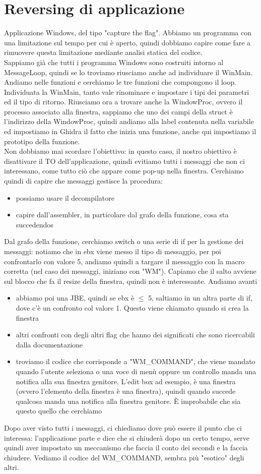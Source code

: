 \documentclass[12pt, oneside]{extbook}
\begin{document}
\section{Reversing di applicazione}
Applicazione Windows, del tipo "capture the flag". Abbiamo un programma con una limitazione sul tempo per cui è aperto, quindi dobbiamo capire come fare a rimuovere questa limitazione mediante analisi statica del codice.\\ Sappiamo già che tutti i programma Windows sono costruiti intorno al MessageLoop, quindi se lo troviamo riusciamo anche ad individuare il WinMain. Andiamo nelle funzioni e cerchiamo le tre funzioni che compongono il loop. Individuata la WinMain, tanto vale rinominare e impostare i tipi dei parametri ed il tipo di ritorno. Riusciamo ora a trovare anche la WindowProc, ovvero il processo associato alla finestra, sappiamo che uno dei campi della struct è l'indirizzo della WindowProc, quindi andiamo alla label contenuta nella variabile ed impostiamo in Ghidra il fatto che inizia una funzione, anche qui impostiamo il prototipo della funzione.\\ Non dobbiamo mai scordare l'obiettivo: in questo caso, il nostro obiettivo è disattivare il TO dell'applicazione, quindi evitiamo tutti i messaggi che non ci interessano, come tutto ciò che appare come pop-up nella finestra. Cerchiamo quindi di capire che messaggi gestisce la procedura:
\begin{itemize}
\item possiamo usare il decompilatore
\item capire dall'assembler, in particolare dal grafo della funzione, cosa sta succedendos
\end{itemize}
Dal grafo della funzione, cerchiamo switch o una serie di if per la gestione dei messaggi: notiamo che in ebx viene messo il tipo di messaggio, per poi confrontarlo con valore 5, andiamo quindi a targare il messaggio con la macro corretta (nel caso dei messaggi, iniziano con "WM"). Capiamo che il salto avviene sul blocco che fa il resize della finestra, quindi non è interessante. Andiamo avanti 
\begin{itemize}
\item abbiamo poi una JBE, quindi se ebx è $\leq$ 5, saltiamo in un altra parte di if, dove c'è un confronto col valore 1. Questo viene chiamato quando si crea la finestra
\item altri confronti con degli altri flag che hanno dei significati che sono ricercabili dalla documentazione
\item troviamo il codice che corrisponde a "WM\_COMMAND", che viene mandato quando l'utente seleziona o una voce di menù oppure un controllo manda una notifica alla sua finestra genitore. L'edit box ad esempio, è una finestra (ovvero l'elemento della finestra è una finestra), quindi quando succede qualcosa manda una notifica alla finestra genitore. È improbabile che sia questo quello che cerchiamo
\end{itemize}
Dopo aver visto tutti i messaggi, ci chiediamo dove può essere il punto che ci interessa: l'applicazione parte e dice che si chiuderà dopo un certo tempo, serve quindi aver impostato un meccanismo che faccia il conto dei secondi e la faccia chiudere. Vediamo il codice del WM\_COMMAND, sembra più "esotico" degli altri.
\end{document}
